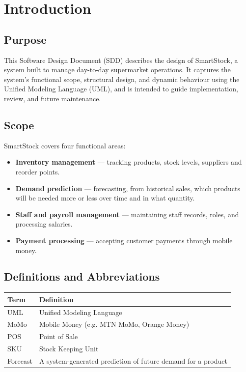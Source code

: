 \documentclass[11pt,a4paper]{report}
\newcommand{\sysname}{SmartStock}
\begin{document}
\tableofcontents
\clearpage

\chapter{Introduction}

\section{Purpose}
This Software Design Document (SDD) describes the design of \sysname{}, a system built to manage day-to-day supermarket operations. It captures the system's functional scope, structural design, and dynamic behaviour using the Unified Modeling Language (UML), and is intended to guide implementation, review, and future maintenance.

\section{Scope}
\sysname{} covers four functional areas:
\begin{itemize}[leftmargin=1.4em]
  \item \textbf{Inventory management} --- tracking products, stock levels, suppliers and reorder points.
  \item \textbf{Demand prediction} --- forecasting, from historical sales, which products will be needed more or less over time and in what quantity.
  \item \textbf{Staff and payroll management} --- maintaining staff records, roles, and processing salaries.
  \item \textbf{Payment processing} --- accepting customer payments through mobile money.
\end{itemize}

\section{Definitions and Abbreviations}
\begin{center}
\begin{tabular}{@{}p{3.2cm}p{10.5cm}@{}}
\toprule
\textbf{Term} & \textbf{Definition} \\
\midrule
UML & Unified Modeling Language \\
MoMo & Mobile Money (e.g. MTN MoMo, Orange Money) \\
POS & Point of Sale \\
SKU & Stock Keeping Unit \\
Forecast & A system-generated prediction of future demand for a product \\
\bottomrule
\end{tabular}
\end{center}
\end{document}
